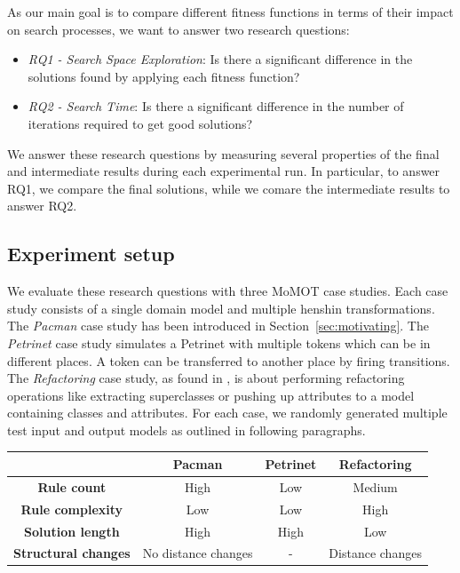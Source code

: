 As our main goal is to compare different fitness functions in terms of their impact on search processes, we want to answer two research questions:

\begin{itemize}
	\item \textit{RQ1 - Search Space Exploration}: Is there a significant difference in the solutions found by applying each fitness function?
	\item \textit{RQ2 - Search Time}: Is there a significant difference in the number of iterations required to get good solutions?
\end{itemize}

We answer these research questions by measuring several properties of the final and intermediate results during each experimental run.
In particular, to answer RQ1, we compare the final solutions, while we comare the intermediate results to answer RQ2.

\subsection{Experiment setup}


We evaluate these research questions with three MoMOT case studies. Each case study consists of a single domain model and multiple henshin transformations.
The \textit{Pacman} case study has been introduced in Section~\ref{sec:motivating}. The \textit{Petrinet} case study simulates a Petrinet with multiple tokens which can be in different places. A token can be transferred to another place by firing transitions. The \textit{Refactoring} case study, as found in \cite{?}, is about performing refactoring operations like extracting superclasses or pushing up attributes to a model containing classes and attributes.
For each case, we randomly generated multiple test input and output models as outlined in following paragraphs.

\begin{table}
\begin{tabular}{|c|c|c|c|}
\hline 
 & \textbf{Pacman} & \textbf{Petrinet} & \textbf{Refactoring} \\
\hline
\textbf{Rule count} & High & Low & Medium \\
\hline
\textbf{Rule complexity} & Low & Low & High \\
\hline
\textbf{Solution length} & High & High & Low \\
\hline
\textbf{Structural changes} & No distance changes & - & Distance changes \\
\hline
\end{tabular}
\end{table}


